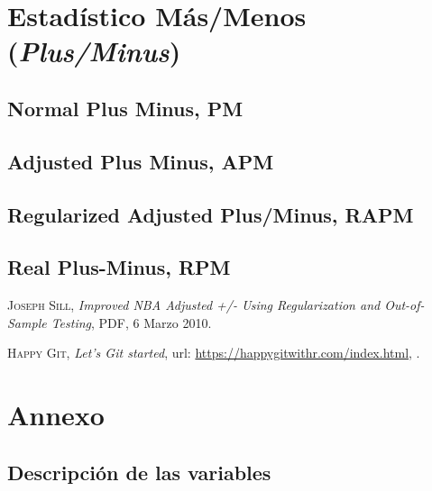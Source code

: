 \documentclass[paper=a4, fontsize=9pt]{article}
\begin{document}
\clearpage

\section{Estadístico Más/Menos (\emph{Plus/Minus})}

\subsection{Normal Plus Minus, PM}

\subsection{Adjusted Plus Minus, APM}

\subsection{Regularized Adjusted Plus/Minus, RAPM}

\subsection{Real Plus-Minus, RPM}

\clearpage


\begin{thebibliography}{X}
	 \textsc{Joseph Sill}, \textit{Improved NBA Adjusted +/- Using Regularization and Out-of-Sample Testing}, PDF, 6 Marzo 2010.
	
	 \textsc{Happy Git}, \textit{Let’s Git started}, url: \url{https://happygitwithr.com/index.html}, .
\end{thebibliography}

\clearpage

\section{Annexo}

\subsection{Descripción de las variables} \label{sec:Annexo1}
\end{document}
